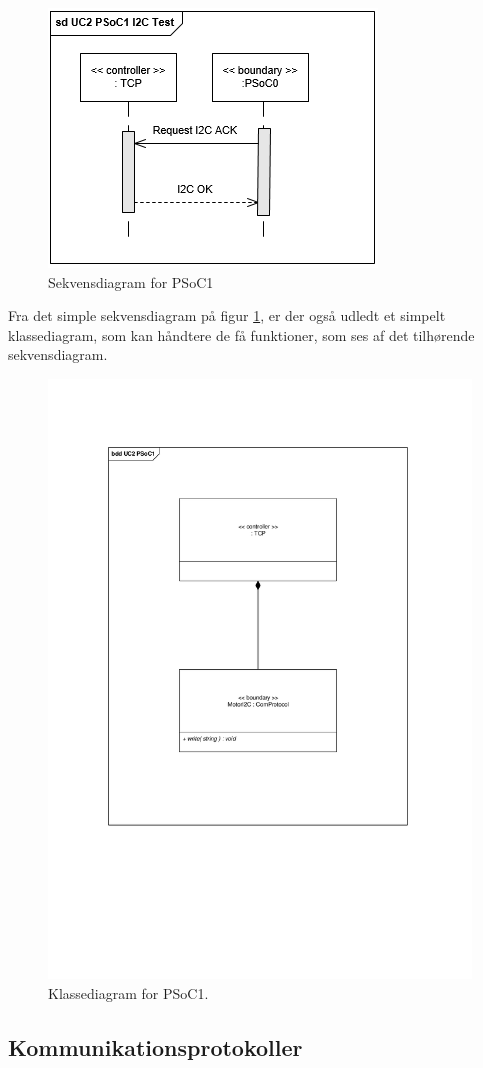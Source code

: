 \begin{figure}[H]
	\centering
	\includegraphics[width=.8\textwidth] {Systemarkitektur/images/SDPSoC1I2CTest}
	\caption{Sekvensdiagram for PSoC1}
	\label{fig:sekvensPSoC1I2CTest}
\end{figure}

Fra det simple sekvensdiagram på figur \ref{fig:sekvensPSoC1I2CTest}, er der også udledt et simpelt klassediagram, som kan håndtere de få funktioner, som ses af det tilhørende sekvensdiagram. 

\begin{figure}[H]
	\centering
	\includegraphics[width=.5\textwidth]{Systemarkitektur/images/klassediagramPSoC1}
	\caption{Klassediagram for PSoC1.}
	\label{fig:klassePSoC1}
\end{figure}



\subsection{Kommunikationsprotokoller}

